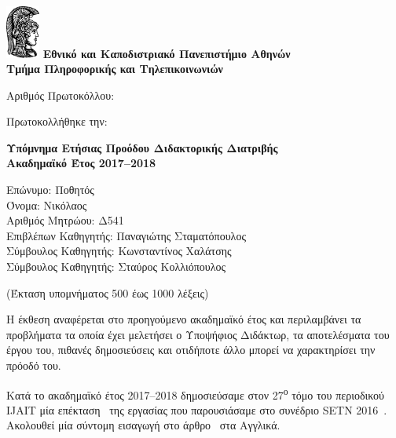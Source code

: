 \documentclass[a4paper]{article}
\begin{document}

\includegraphics[width=3em]{athena}
\textbf{Εθνικό και Καποδιστριακό Πανεπιστήμιο Αθηνών \\
        Τμήμα Πληροφορικής και Τηλεπικοινωνιών}

\vspace{1.3em}

\noindent
Αριθμός Πρωτοκόλλου:

\noindent
Πρωτοκολλήθηκε την:

\vspace{1.3em}

\begin{center}
  \textbf{Υπόμνημα Ετήσιας Προόδου Διδακτορικής Διατριβής \\
          Ακαδημαϊκό Έτος 2017–2018}
\end{center}

\vspace{1em}

\noindent
Επώνυμο: Ποθητός \\
Όνομα: Νικόλαος \\
Αριθμός Μητρώου: Δ541 \\
Επιβλέπων Καθηγητής: Παναγιώτης Σταματόπουλος \\
Σύμβουλος Καθηγητής: Κωνσταντίνος Χαλάτσης \\
Σύμβουλος Καθηγητής: Σταύρος Κολλιόπουλος

\begin{center}
  (Έκταση υπομνήματος 500 έως 1000 λέξεις)
\end{center}

Η έκθεση αναφέρεται στο προηγούμενο ακαδημαϊκό έτος και
περιλαμβάνει τα προβλήματα τα οποία έχει μελετήσει ο
Υποψήφιος Διδάκτωρ, τα αποτελέσματα του έργου του, πιθανές
δημοσιεύσεις και οτιδήποτε άλλο μπορεί να χαρακτηρίσει την
πρόοδό του.

\vspace{1em}

Κατά το ακαδημαϊκό έτος 2017–2018 δημοσιεύσαμε στον
27\textsuperscript{ο} τόμο του περιοδικού IJAIT μία
επέκταση~\cite{Pothitos2018} της εργασίας που παρουσιάσαμε
στο συνέδριο SETN 2016~\cite{Pothitos2016-PoPS}. Ακολουθεί
μία σύντομη εισαγωγή στο άρθρο~\cite{Pothitos2018} στα
Αγγλικά.
\end{document}
